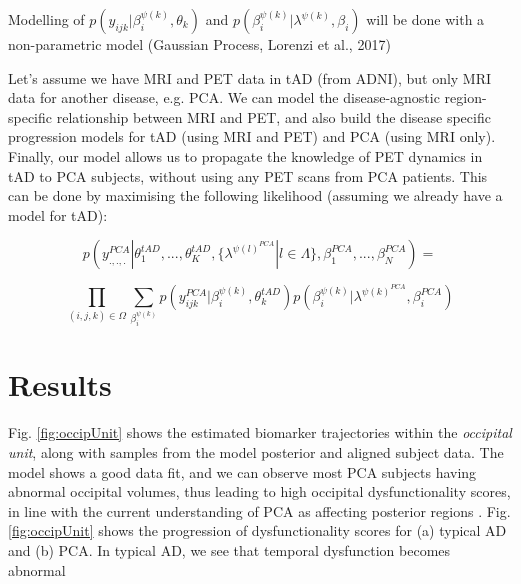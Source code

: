\documentclass{llncs}
\begin{document}
Modelling of $p(y_{ijk}| \beta_i^{\psi(k)}, \theta_k)$ and $p(\beta_i^{\psi(k)}| \lambda^{\psi(k)}, \beta_i)$ will be done with a non-parametric model (Gaussian Process, Lorenzi et al., 2017)


Let's assume we have MRI and PET data in tAD (from ADNI), but only MRI data for another disease, e.g. PCA. We can model the disease-agnostic region-specific relationship between MRI and PET, and also build the disease specific progression models for tAD (using MRI and PET) and PCA (using MRI only). Finally, our model allows us to propagate the knowledge of PET dynamics in tAD to PCA subjects, without using any PET scans from PCA patients. This can be done by maximising the following likelihood (assuming we already have a model for tAD):

\begin{equation}
 p(y_{.,.,.}^{PCA}|\theta_1^{tAD}, ..., \theta_K^{tAD}, \{\lambda^{\psi(l)^{PCA}} | l \in \Lambda \}, \beta_1^{PCA}, ..., \beta_N^{PCA}) = 
\end{equation}

 \begin{equation}
 \prod_{(i,j,k) \in \Omega} \sum_{\beta_i^{\psi(k)}} p(y_{ijk}^{PCA}| \beta_i^{\psi(k)}, \theta_k^{tAD}) p(\beta_i^{\psi(k)}| \lambda^{\psi(k)^{PCA}}, \beta_i^{PCA})
\end{equation}

\section{Results}

Fig. \ref{fig:occipUnit} shows the estimated biomarker trajectories within the \emph{occipital unit}, along with samples from the model posterior and aligned subject data. The model shows a good data fit, and we can observe most PCA subjects having abnormal occipital volumes, thus leading to high occipital dysfunctionality scores, in line with the current understanding of PCA as affecting posterior regions \cite{crutch2012posterior}. Fig. \ref{fig:occipUnit} shows the progression of dysfunctionality scores for (a) typical AD and (b) PCA. In typical AD, we see that temporal dysfunction becomes abnormal  

\newcommand{\expFld}{figures}
\end{document}
